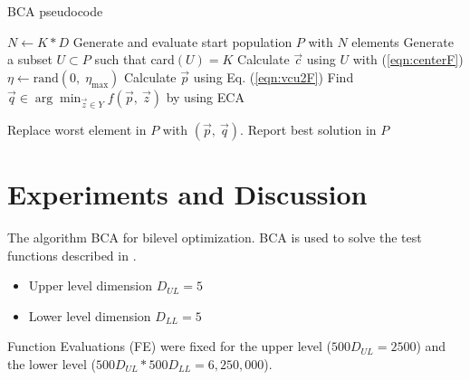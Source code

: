 \documentclass[conference]{IEEEtran}
\begin{document}
\begin{algorithm}[!t]
    \caption{BCA pseudocode}
    \label{alg:BCA}
    \begin{algorithmic}[1]
        \STATE $N \gets K * D$
        \STATE Generate and evaluate start population $P$ with $N$ elements
                \STATE Generate a subset $U \subset P$ such that  card$(U) = K$
                \STATE Calculate $\vec{c}$ using $U$ with (\ref{eqn:centerF})
                \STATE $\eta \gets \text{rand}(0,\; \eta_{\max}) $ 
                \STATE Calculate $\vec{p}$ using Eq. (\ref{eqn:vcu2F})
                \STATE Find $\displaystyle \vec{q} \in \arg \min_{\vec{z}\in Y} f(\vec{p},\ \vec{z})$ by using ECA
                
                    \STATE Replace worst element in $P$ with $(\vec{p},\ \vec{q})$.
                \ENDIF
            \ENDFOR
        \ENDWHILE
        \STATE Report best solution in $P$
    \end{algorithmic}
\end{algorithm}

\section{Experiments and Discussion}


The algorithm BCA for bilevel optimization. BCA is used to solve the test functions
described in \cite{sinha2012unconstrained,sinha2014test}.

\begin{itemize}
    \item Upper level dimension $D_{UL} = 5$
    \item Lower level dimension $D_{LL} = 5$
\end{itemize}

Function Evaluations (FE) were fixed for the upper level ($500D_{UL} = 2500$) and
the lower level ($500D_{UL}*500D_{LL} = 6,250,000$).
\end{document}
